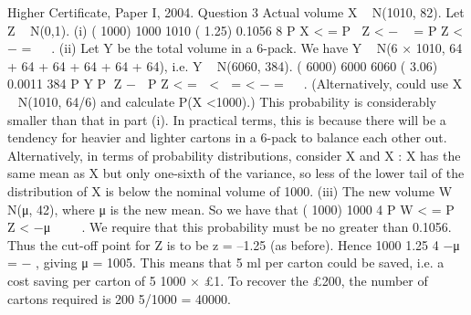 Higher Certificate, Paper I, 2004. Question 3
Actual volume X ~ N(1010, 82). Let Z ~ N(0,1).
(i) ( 1000) 1000 1010 ( 1.25) 0.1056
8
P X < = P Z < −  = P Z < − =
 
.
(ii) Let Y be the total volume in a 6-pack.
We have Y ~ N(6 × 1010, 64 + 64 + 64 + 64 + 64 + 64), i.e. Y ~ N(6060, 384).
( 6000) 6000 6060 ( 3.06) 0.0011
384
P Y P Z −  P Z < =  <  = < − =
 
.
(Alternatively, could use X ~ N(1010, 64/6) and calculate P(X <1000).)
This probability is considerably smaller than that in part (i). In practical terms, this is
because there will be a tendency for heavier and lighter cartons in a 6-pack to balance
each other out. Alternatively, in terms of probability distributions, consider X and X :
X has the same mean as X but only one-sixth of the variance, so less of the lower tail
of the distribution of X is below the nominal volume of 1000.
(iii) The new volume W ~ N(μ, 42), where μ is the new mean. So we have that
( 1000) 1000
4
P W < = P Z < −μ 
 
. We require that this probability must be no greater
than 0.1056. Thus the cut-off point for Z is to be z = –1.25 (as before). Hence
1000 1.25
4
−μ = − , giving μ = 1005.
This means that 5 ml per carton could be saved, i.e. a cost saving per carton of
5
1000
× £1. To recover the £200, the number of cartons required is 200
5/1000
= 40000.
